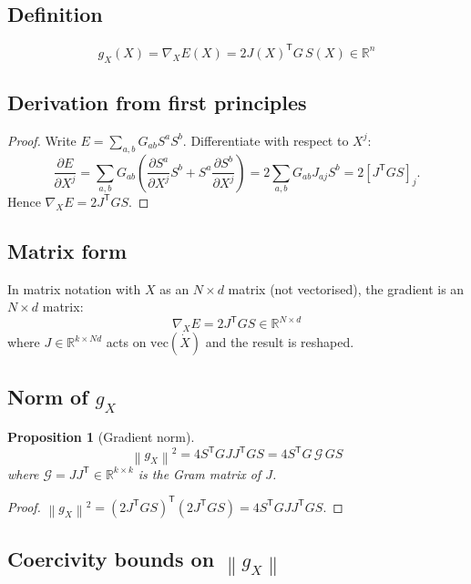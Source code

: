 \documentclass[11pt,a4paper]{article}
\newtheorem{proposition}[theorem]{Proposition}
\theoremstyle{definition}
\newcommand{\R}{\mathbb{R}}
\newcommand{\T}{^{\mathsf{T}}}
\newcommand{\norm}[1]{\left\|#1\right\|}
\newcommand{\gX}{g_X}
\begin{document}
\subsection{Definition}

\begin{lockedbox}
\[
\gX(X) = \nabla_X E(X) = 2J(X)\T G\, S(X) \in \R^n
\]
\end{lockedbox}

\subsection{Derivation from first principles}

\begin{proof}
Write $E = \sum_{a,b} G_{ab} S^a S^b$.
Differentiate with respect to $X^j$:
\[
\frac{\partial E}{\partial X^j}
= \sum_{a,b} G_{ab}\left(\frac{\partial S^a}{\partial X^j} S^b + S^a \frac{\partial S^b}{\partial X^j}\right)
= 2\sum_{a,b} G_{ab} J_{aj} S^b
= 2[J\T G S]_j.
\]
Hence $\nabla_X E = 2J\T G S$.
\end{proof}

\subsection{Matrix form}

In matrix notation with $X$ as an $N\times d$ matrix (not vectorised),
the gradient is an $N\times d$ matrix:
\[
\nabla_X E = 2J\T G S \in \R^{N\times d}
\]
where $J \in \R^{k\times Nd}$ acts on $\mathrm{vec}(\dot X)$ and the result is reshaped.

\subsection{Norm of $g_X$}

\begin{proposition}[Gradient norm]
\[
\norm{\gX}^2 = 4 S\T G J J\T G S = 4 S\T G\, \mathcal{G}\, G S
\]
where $\mathcal{G} = JJ\T \in \R^{k\times k}$ is the Gram matrix of $J$.
\end{proposition}

\begin{proof}
$\norm{\gX}^2 = (2J\T GS)\T(2J\T GS) = 4 S\T G J J\T G S$.
\end{proof}

\subsection{Coercivity bounds on $\norm{g_X}$}
\end{document}
